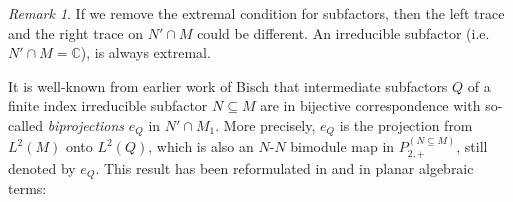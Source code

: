 \documentclass[11pt,letterpaper]{amsart}
\theoremstyle{definition}
\theoremstyle{remark}
\newtheorem{remark}[theorem]{Remark}
\begin{document}
\begin{remark}
If we remove the extremal condition for subfactors, then the left trace and the right trace on $N'\cap M$ could be different. 
An irreducible subfactor (i.e. $N'\cap M=\mathbb{C}$), is always extremal. 
\end{remark}

 It is well-known from earlier work of Bisch \cite{Bi1} that intermediate subfactors $Q$ of a finite index irreducible subfactor $N\subseteq M$ are in bijective correspondence with so-called {\it biprojections} $e_Q$ in $N' \cap M_1$.
More precisely, $e_Q$ is the projection from $L^2(M)$ onto $L^2(Q)$, which is also an $N$-$N$ bimodule map in $P^{(N\subseteq M)}_{2,+}$, still denoted by $e_Q$.
This result has been reformulated in  \cite{La} and \cite{BiJo2}   in planar algebraic terms:
\end{document}
